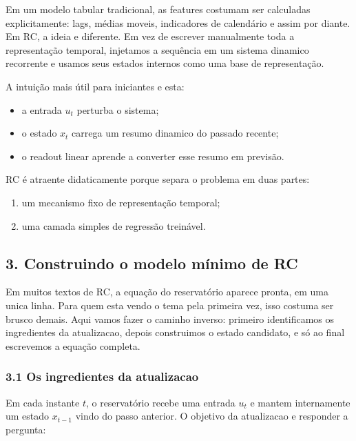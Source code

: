 \documentclass[12pt]{article}
\providecommand{\tightlist}{%
          \setlength{\itemsep}{0pt}\setlength{\parskip}{0pt}}
\begin{document}
Em um modelo tabular tradicional, as features costumam ser calculadas explicitamente: lags, médias moveis, indicadores de calendário e assim por diante. Em RC, a ideia e diferente. Em vez de escrever manualmente toda a representação temporal, injetamos a sequência em um sistema dinamico recorrente e usamos seus estados internos como uma base de representação.

A intuição mais útil para iniciantes e esta:

\begin{itemize}
\tightlist
\item
  a entrada \(u_t\) perturba o sistema;
\item
  o estado \(x_t\) carrega um resumo dinamico do passado recente;
\item
  o readout linear aprende a converter esse resumo em previsão.
\end{itemize}

RC é atraente didaticamente porque separa o problema em duas partes:

\begin{enumerate}
\def\labelenumi{\arabic{enumi}.}
\tightlist
\item
  um mecanismo fixo de representação temporal;
\item
  uma camada simples de regressão treinável.
\end{enumerate}

\subsection{3. Construindo o modelo mínimo de RC}\label{3-construindo-o-modelo-muxednimo-de-rc}

Em muitos textos de RC, a equação do reservatório aparece pronta, em uma unica linha. Para quem esta vendo o tema pela primeira vez, isso costuma ser brusco demais. Aqui vamos fazer o caminho inverso: primeiro identificamos os ingredientes da atualizacao, depois construimos o estado candidato, e só ao final escrevemos a equação completa.

\subsubsection{3.1 Os ingredientes da atualizacao}\label{31-os-ingredientes-da-atualizacao}

Em cada instante \(t\), o reservatório recebe uma entrada \(u_t\) e mantem internamente um estado \(x_{t-1}\) vindo do passo anterior. O objetivo da atualizacao e responder a pergunta:
\end{document}
